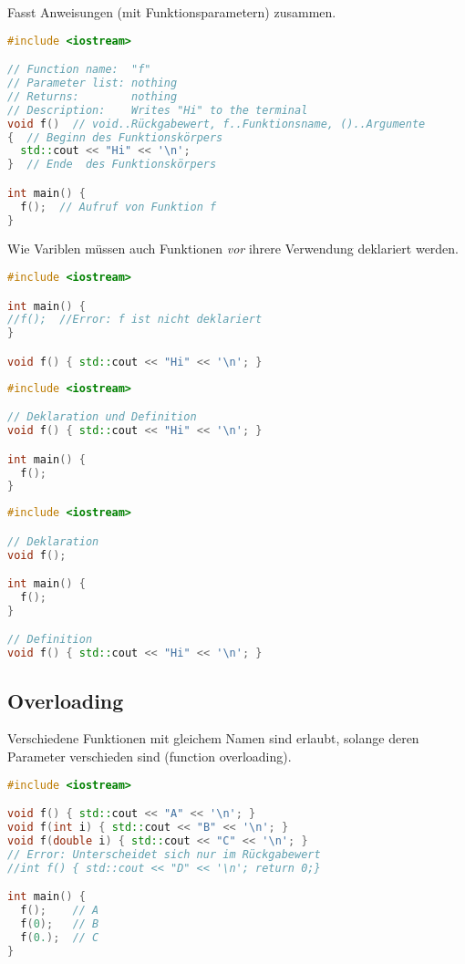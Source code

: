 \documentclass[10pt,twocolumn]{scrartcl}
\begin{document}
Fasst Anweisungen (mit Funktionsparametern) zusammen.

\begin{lstlisting}[language=C++]
#include <iostream>

// Function name:  "f"
// Parameter list: nothing
// Returns:        nothing
// Description:    Writes "Hi" to the terminal
void f()  // void..Rückgabewert, f..Funktionsname, ()..Argumente
{  // Beginn des Funktionskörpers
  std::cout << "Hi" << '\n';
}  // Ende  des Funktionskörpers

int main() {
  f();  // Aufruf von Funktion f
}
\end{lstlisting}

Wie Variblen müssen auch Funktionen \emph{vor} ihrere Verwendung deklariert
werden.

\begin{lstlisting}[language=C++]
#include <iostream>

int main() {
//f();  //Error: f ist nicht deklariert
}

void f() { std::cout << "Hi" << '\n'; }
\end{lstlisting}

\begin{lstlisting}[language=C++]
#include <iostream>

// Deklaration und Definition
void f() { std::cout << "Hi" << '\n'; }

int main() {
  f();
}
\end{lstlisting}

\begin{lstlisting}[language=C++]
#include <iostream>

// Deklaration
void f();

int main() {
  f();
}

// Definition
void f() { std::cout << "Hi" << '\n'; }
\end{lstlisting}

\subsection{Overloading}

Verschiedene Funktionen mit gleichem Namen sind erlaubt, solange deren Parameter
verschieden sind (function overloading).

\begin{lstlisting}[language=C++]
#include <iostream>

void f() { std::cout << "A" << '\n'; }
void f(int i) { std::cout << "B" << '\n'; }
void f(double i) { std::cout << "C" << '\n'; }
// Error: Unterscheidet sich nur im Rückgabewert
//int f() { std::cout << "D" << '\n'; return 0;}

int main() {
  f();    // A
  f(0);   // B
  f(0.);  // C
}
\end{lstlisting}
\end{document}
